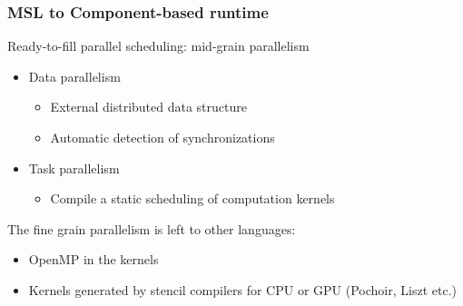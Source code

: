 \documentclass{beamer}
\begin{document}
\begin{frame}
\frametitle{MSL to Component-based runtime}
\begin{block}{Ready-to-fill parallel scheduling: mid-grain parallelism}
\begin{itemize}
\item Data parallelism
\begin{itemize}
\item External distributed data structure
\item Automatic detection of synchronizations
\end{itemize}
\item Task parallelism
\begin{itemize}
\item Compile a static scheduling of computation kernels
\end{itemize}
\end{itemize}
\end{block}
The fine grain parallelism is left to other languages: 
\begin{itemize}
\item OpenMP in the kernels
\item Kernels generated by stencil compilers for CPU or GPU (Pochoir, Liszt etc.)
\end{itemize}
\end{frame}
\end{document}
